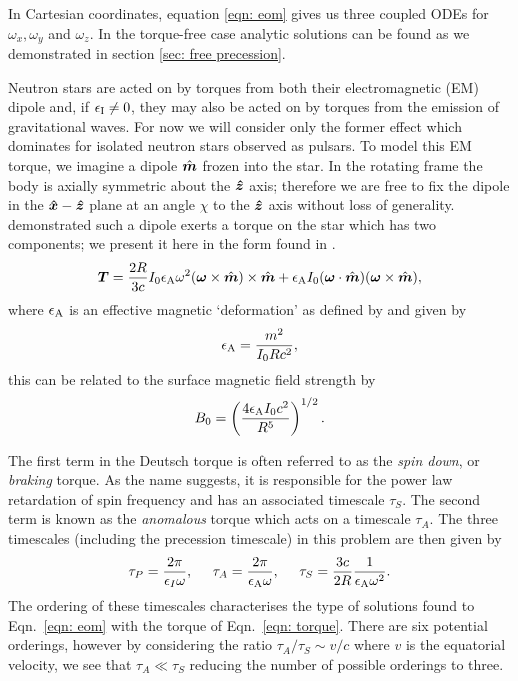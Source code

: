 \documentclass[../full_thesis/full_thesis.tex]{subfiles}
\begin{document}
In Cartesian coordinates, equation \ref{eqn: eom} gives us three coupled ODEs
for $\omega_{x}, \omega_{y}$ and $\omega_{z}$. In the torque-free case analytic
solutions can be found as we demonstrated in section \ref{sec: free precession}.

Neutron stars are acted on by torques from both their electromagnetic (EM)
dipole and, if $\epsilon_{\mathrm{I}} \ne 0$, they may also be acted on by torques from the
emission of gravitational waves. For now we will consider only the former
effect which dominates for isolated neutron stars observed as pulsars. To model
this EM torque, we imagine a dipole $\hat{\boldsymbol{m}}$ frozen into the star. In the rotating
frame the body is axially symmetric about the $\boldsymbol{\hat{z}}$ axis; therefore we are free
to fix the dipole in the $\boldsymbol{\hat{x}}-\boldsymbol{\hat{z}}$ plane at an angle $\chi$ to the $\boldsymbol{\hat{z}}$ axis
without loss of generality. \citet{Deutsch1955} demonstrated such a dipole
exerts a torque on the star which has two components; we present it here in the
form found in \citet{Goldreich1970}.
\begin{equation}
\boldsymbol{T}=\frac{2R}{3c} I_{0}\epsilon_{\mathrm{A}}\omega^{2}
               (\boldsymbol{\omega} \times \hat{\boldsymbol{m}})\times \hat{\boldsymbol{m}}
               + \epsilon_{\mathrm{A}} I_{0}(\boldsymbol{\omega} \cdot \hat{\boldsymbol{m}})
               (\boldsymbol{\omega} \times \hat{\boldsymbol{m}}),
\label{eqn: torque}
\end{equation}
where $\epsilon_{\mathrm{A}}$ is an effective magnetic `deformation' as defined by \citet{Glampedakis2010}
and given by 
\begin{align}
\epsilon_{\mathrm{A}} = \frac{m^{2}}{I_{0}R c^{2}},
\end{align}
this can be related to the surface magnetic field strength by
\begin{equation}
    B_{0} = \left(\frac{4 \epsilon_{\mathrm{A}} I_{0} c^{2}}{R^{5}}\right)^{1/2}.
    \label{eqn: magnetic field epsA}
\end{equation}

The first term in the Deutsch torque is often referred to as the \emph{spin
down}, or \emph{braking} torque. As the name suggests, it is responsible for the
power law retardation of spin frequency and has an associated timescale
$\tau_{S}$. The second term is known as the \emph{anomalous} torque which acts
on a timescale $\tau_{A}$. The three timescales (including the precession timescale)
in this problem are then given by
\begin{equation}
\tau_{P}=\frac{2\pi}{\epsilon_{I}\omega},  \;\;\;\;\;
\tau_{A}=\frac{2\pi}{\epsilon_{\mathrm{A}}\omega},  \;\;\;\;\;
\tau_{S}=\frac{3c}{2R}\frac{1}{\epsilon_{\mathrm{A}}\omega^{2}}.
\label{eqn: torque timescales}
\end{equation}
The ordering of these timescales characterises the type of solutions found to
Eqn.~\eqref{eqn: eom} with the torque of Eqn.~\eqref{eqn: torque}. There are
six potential orderings, however by considering the ratio $\tau_{A}/\tau_{S}
\sim v/c$ where $v$ is the equatorial velocity, we see that $\tau_{A} \ll
\tau_{S}$ reducing the number of possible orderings to three.
\end{document}
